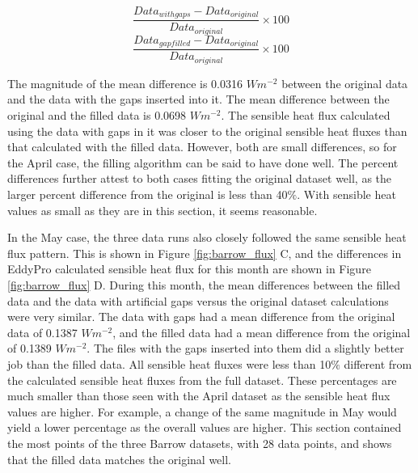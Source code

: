\begin{equation}\label{eq:withgaps}
\frac{Data_{with gaps} - Data_{original}}{Data_{original}} \times 100
\end{equation}
\begin{equation}\label{eq:withoutgaps}
\frac{Data_{gap filled} - Data_{original}}{Data_{original}} \times 100
\end{equation}

The magnitude of the mean difference is 0.0316 $Wm^{-2}$ between the original data and the data with the gaps inserted into it. The mean difference between the original and the filled data is 0.0698 $Wm^{-2}$. The sensible heat flux calculated using the data with gaps in it was closer to the original sensible heat fluxes than that calculated with the filled data. However, both are small differences, so for the April case, the filling algorithm can be said to have done well.  The percent differences further attest to both cases fitting the original dataset well, as the larger percent difference from the original is less than 40$\%$. With sensible heat values as small as they are in this section, it seems reasonable.

In the May case, the three data runs also closely followed the same sensible heat flux pattern. This is shown in Figure \ref{fig:barrow_flux} C, and the differences in EddyPro calculated sensible heat flux for this month are shown in Figure \ref{fig:barrow_flux} D. During this month, the mean differences between the filled data and the data with artificial gaps versus the original dataset calculations were very similar. The data with gaps had a mean difference from the original data of 0.1387 $Wm^{-2}$, and the filled data had a mean difference from the original of 0.1389 $Wm^{-2}$. The files with the gaps inserted into them did a slightly better job than the filled data. All sensible heat fluxes were less than 10$\%$ different from the calculated sensible heat fluxes from the full dataset. These percentages are much smaller than those seen with the April dataset as the sensible heat flux values are higher. For example, a change of the same magnitude in May would yield a lower percentage as the overall values are higher. This section contained the most points of the three Barrow datasets, with 28 data points, and shows that the filled data matches the original well. 


